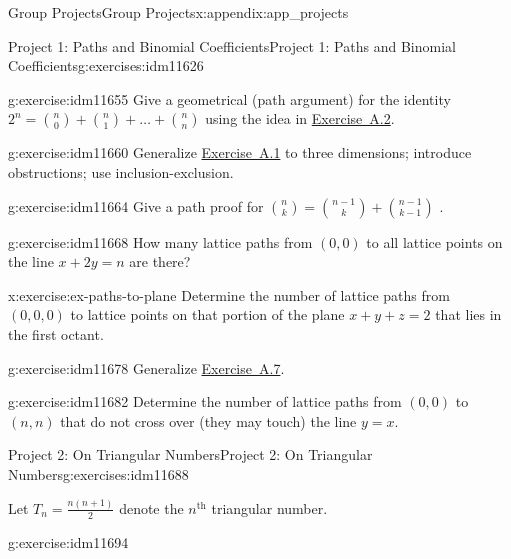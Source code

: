 \documentclass[oneside,10pt,]{book}
\numberwithin{equation}{chapter}
\begin{document}
\begin{appendixptx}{Group Projects}{}{Group Projects}{}{}{x:appendix:app_projects}
\begin{exercises-section-numberless}{Project 1: Paths and Binomial Coefficients}{}{Project 1: Paths and Binomial Coefficients}{}{}{g:exercises:idm11626}
\begin{divisionexercise}{3}{}{}{g:exercise:idm11655}
Give a geometrical (path argument) for the identity \(2^{n} =
\binom{n}{0}
+
\binom{n}{1}
+ \ldots +
\binom{n}{n}\) using the idea in \hyperlink{x:exercise:ex-paths-on-lines}{Exercise~A.2}.%
\end{divisionexercise}%
\begin{divisionexercise}{4}{}{}{g:exercise:idm11660}%
Generalize \hyperlink{x:exercise:ex-count-paths}{Exercise~A.1} to three dimensions; introduce obstructions; use inclusion-exclusion.%
\end{divisionexercise}%
\begin{divisionexercise}{5}{}{}{g:exercise:idm11664}%
Give a path proof for \(\binom{n}{k}
=
\binom{n - 1}{k}
+
\binom{n - 1}{k - 1}\) .%
\end{divisionexercise}%
\begin{divisionexercise}{6}{}{}{g:exercise:idm11668}%
How many lattice paths from \(\left( 0,0 \right)\) to all lattice points on the line \(x + 2y = n\) are there?%
\end{divisionexercise}%
\begin{divisionexercise}{7}{}{}{x:exercise:ex-paths-to-plane}%
Determine the number of lattice paths from \(\left( 0,0,0 \right)\) to lattice points on that portion of the plane \(x + y + z = 2\) that lies in the first octant.%
\end{divisionexercise}%
\begin{divisionexercise}{8}{}{}{g:exercise:idm11678}%
Generalize \hyperlink{x:exercise:ex-paths-to-plane}{Exercise~A.7}.%
\end{divisionexercise}%
\begin{divisionexercise}{9}{}{}{g:exercise:idm11682}%
Determine the number of lattice paths from \(\left( 0,0 \right)\) to \((n,n)\) that do not cross over (they may touch) the line \(y = x\).%
\end{divisionexercise}%
\end{exercises-section-numberless}
%
%
\typeout{************************************************}
\typeout{************************************************}
%
\begin{exercises-section-numberless}{Project 2: On Triangular Numbers}{}{Project 2: On Triangular Numbers}{}{}{g:exercises:idm11688}
\begin{introduction}{}%
Let \(T_{n} = \frac{n\left( n + 1 \right)}{2}\) denote the \(n^{\text{th}}\) triangular number.%
\end{introduction}%
\begin{divisionexercise}{1}{}{}{g:exercise:idm11694}%

\end{divisionexercise}
\end{exercises-section-numberless}
\end{appendixptx}
\end{document}
